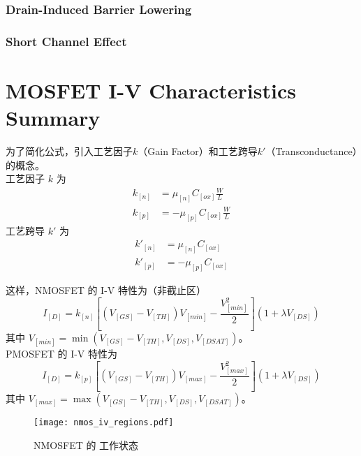 \subsubsection{Drain-Induced Barrier Lowering}

\subsubsection{Short Channel Effect}

\section{MOSFET I-V Characteristics Summary}

为了简化公式，引入工艺因子$k$（Gain Factor）和工艺跨导$k'$（Transconductance）的概念。\\
工艺因子 $k$ 为
\begin{equation}
    \begin{aligned}
        k_[n] &= \mu_[n] C_[ox] \frac{W}{L} \\
        k_[p] &= -\mu_[p] C_[ox] \frac{W}{L}
    \end{aligned}
\end{equation}
工艺跨导 $k'$ 为
\begin{equation}
    \begin{aligned}
        k'_[n] &= \mu_[n] C_[ox] \\
        k'_[p] &= -\mu_[p] C_[ox]
    \end{aligned}
\end{equation}

这样，NMOSFET 的 I-V 特性为（非截止区）
\begin{equation}
    I_[D] = k_[n] \left[ (V_[GS] - V_[TH]) V_[min] - \frac{V_[min]^2}{2} \right] \left(1 + \lambda V_[DS]\right)
\end{equation}
其中 $V_[min] = \min \left(V_[GS] - V_[TH], V_[DS], V_[DSAT]\right)$。\\
PMOSFET 的 I-V 特性为
\begin{equation}
    I_[D] = k_[p] \left[ (V_[GS] - V_[TH]) V_[max] - \frac{V_[max]^2}{2} \right] \left(1 + \lambda V_[DS]\right)
\end{equation}
其中 $V_[max] = \max \left(V_[GS] - V_[TH], V_[DS], V_[DSAT]\right)$。

\begin{figure}[!hbt]
    \centering
    \texttt{[image: nmos\_iv\_regions.pdf]}
    \caption{NMOSFET 的 工作状态}
    \label{fig:nmos_iv_regions}
\end{figure}

